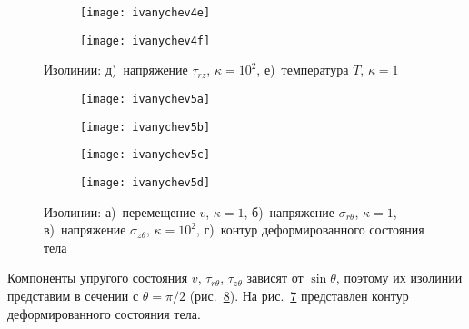 \documentclass[press]{vestnik}
\begin{document}
\addtocounter{figure}{-1}
\begin{figure}
\centering
\begin{subfigure}{.39\textwidth}
\addtocounter{subfigure}{4}
\texttt{[image: ivanychev4e]}
\caption{}
\label{fig4e}
\end{subfigure}
\qquad
\begin{subfigure}{.39\textwidth}
\texttt{[image: ivanychev4f]}
\caption{}
\label{fig4f}
\end{subfigure}
\caption{Изолинии: д)~напряжение $\tau_{rz}$, $\kappa =10^{2}$, е)~температура $T$, $\kappa =1$}
\label{fig4}
\end{figure}

\begin{figure}
\centering
\begin{subfigure}{.39\textwidth}
\texttt{[image: ivanychev5a]}
\caption{}
\label{fig5a}
\end{subfigure}
\qquad
\begin{subfigure}{.39\textwidth}
\texttt{[image: ivanychev5b]}
\caption{}
\label{fig5b}
\end{subfigure}
\begin{subfigure}{.39\textwidth}
\texttt{[image: ivanychev5c]}
\caption{}
\label{fig5c}
\end{subfigure}
\qquad
\begin{subfigure}{.39\textwidth}\centering
\texttt{[image: ivanychev5d]}
\caption{}
\label{fig5d}
\end{subfigure}
\caption{Изолинии: а)~перемещение $v$, $\kappa =1$, б)~напряжение $\sigma 
_{r\theta }$, $\kappa =1$, в)~напряжение $\sigma_{z\theta }$, $\kappa 
=10^{2}$, г)~контур деформированного состояния тела}
\label{fig5}
\end{figure}

Компоненты упругого состояния $v$, $\tau_{r\theta } $, $\tau_{z\theta } $ 
зависят от $\sin \theta $, поэтому их изолинии представим в сечении с 
$\theta = \pi/2$ (рис.~\ref{fig5}). На рис.~\ref{fig5d} представлен контур 
деформированного состояния тела.
\end{document}
